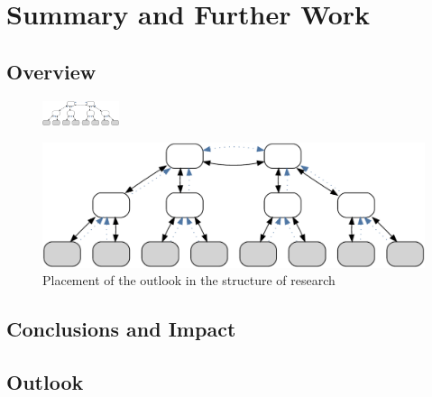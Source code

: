 \chapter{Summary and Further Work}\minitoc\label{sec:summary}\vspace{.5cm}

\section{Overview}

\begin{figure}
    \centering
    \includegraphics[width=0.2\textwidth]{resources/images/example3}
\end{figure}


\begin{figure}
    \centering
    \includegraphics[width=.55\textwidth]{resources/images/example3}
    \caption{Placement of the outlook in the structure of research}\label{fig:hourglass:outlook}
\end{figure}


\section{Conclusions and Impact}





\section{Outlook}


